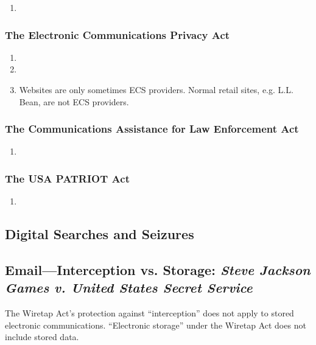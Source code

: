 \begin{enumerate}
    \item %
\end{enumerate}

\subsubsection{The Electronic Communications Privacy Act}

\begin{enumerate}
    \item %
    \item %
    \item Websites are only sometimes ECS providers. Normal retail sites, e.g. 
    L.L. Bean, are not ECS providers.
\end{enumerate}

\subsubsection{The Communications Assistance for Law Enforcement Act}

\begin{enumerate}
    \item %
\end{enumerate}

\subsubsection{The USA PATRIOT Act}

\begin{enumerate}
    \item %
\end{enumerate}

\subsection{Digital Searches and Seizures}

\subsection{Email---Interception vs. Storage: \emph{Steve Jackson Games v. 
United States Secret Service}}

The Wiretap Act's protection against ``interception'' does not apply to 
stored electronic communications. ``Electronic storage'' under the Wiretap Act 
does not include stored data.

